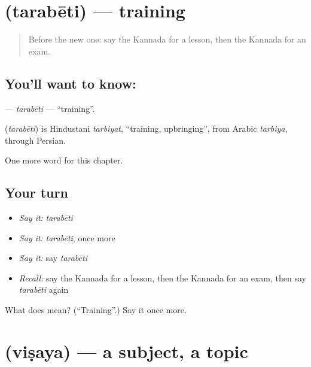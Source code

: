 \section[\texorpdfstring{\kn{ತರಬೇತಿ} (tarabēti)}{ತರಬೇತಿ (tarabēti)}]{ (tarabēti) — training}

\label{lesson:KA-C304-tarabeti}



\begin{quote}
Before the new one: say the Kannada for a lesson, then the Kannada for an exam.
\end{quote}

\subsection*{You'll want to know: }
\textbf{} — \emph{tarabēti} — \textquotedblleft{}training\textquotedblright{}.

\begin{cousinweb}
\textbf{} (\emph{tarabēti}) is Hindustani \emph{tarbiyat}, \textquotedblleft{}training, upbringing\textquotedblright{}, from Arabic \emph{tarbiya}, through Persian.
\end{cousinweb}

\begin{grammarlens}[title={What you've built}]
One more word for this chapter.
\end{grammarlens}

\subsection*{Your turn}
\begin{itemize}
\raggedright
  \item \emph{Say it:} \emph{tarabēti}
  \item \emph{Say it:} \emph{tarabēti}, once more
  \item \emph{Say it:} say \emph{tarabēti}
  \item \emph{Recall:} say the Kannada for a lesson, then the Kannada for an exam, then say \emph{tarabēti} again
\end{itemize}

\begin{tcolorbox}[breakable,colback=teal!4,colframe=teal!35!black,title={Before you move on}]
What does  mean? (\textquotedblleft{}Training\textquotedblright{}.) Say it once more.
\end{tcolorbox}
\section[\texorpdfstring{\kn{ವಿಷಯ} (viṣaya)}{ವಿಷಯ (viṣaya)}]{ (viṣaya) — a subject, a topic}

